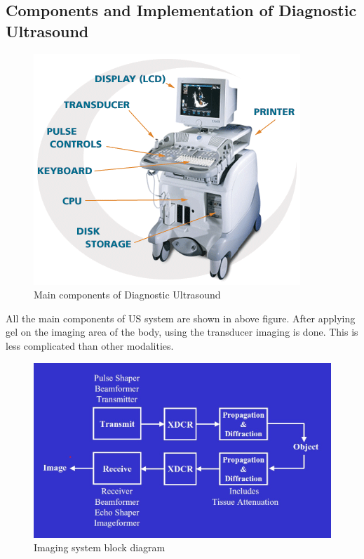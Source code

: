 \documentclass[12pt]{article}
\def \topic{Diagnostic Ultrasound}
\begin{document}
\subsection{Components and Implementation of \topic}

\begin{figure}[h!]
    \centering
    \includegraphics[width=0.6\linewidth]{us.png}
    \caption{\small{Main components of \topic}}
    \label{fig:Main components of US}
\end{figure}
All the main components of US system are shown in above figure. After applying gel on the imaging area of the body, using the transducer imaging is done. This is less complicated than other modalities. 

\begin{figure}[h!]
    \centering
    \includegraphics[width=0.75\linewidth]{u3.jpg}
    \caption{\small{Imaging system block diagram}}
    \label{fig:Imaging system block diagram}
\end{figure}
    
\end{document}
